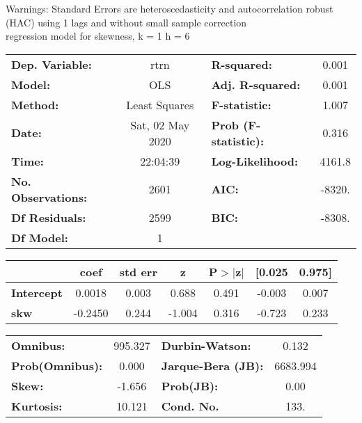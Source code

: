 Warnings: \newline
 [1] Standard Errors are heteroscedasticity and autocorrelation robust (HAC) using 1 lags and without small sample correction\\ 

regression model for skewness, k = 1 h = 6\begin{center}
\begin{tabular}{lclc}
\toprule
\textbf{Dep. Variable:}    &       rtrn       & \textbf{  R-squared:         } &     0.001   \\
\textbf{Model:}            &       OLS        & \textbf{  Adj. R-squared:    } &     0.001   \\
\textbf{Method:}           &  Least Squares   & \textbf{  F-statistic:       } &     1.007   \\
\textbf{Date:}             & Sat, 02 May 2020 & \textbf{  Prob (F-statistic):} &    0.316    \\
\textbf{Time:}             &     22:04:39     & \textbf{  Log-Likelihood:    } &    4161.8   \\
\textbf{No. Observations:} &        2601      & \textbf{  AIC:               } &    -8320.   \\
\textbf{Df Residuals:}     &        2599      & \textbf{  BIC:               } &    -8308.   \\
\textbf{Df Model:}         &           1      & \textbf{                     } &             \\
\bottomrule
\end{tabular}
\begin{tabular}{lcccccc}
                   & \textbf{coef} & \textbf{std err} & \textbf{z} & \textbf{P$> |$z$|$} & \textbf{[0.025} & \textbf{0.975]}  \\
\midrule
\textbf{Intercept} &       0.0018  &        0.003     &     0.688  &         0.491        &       -0.003    &        0.007     \\
\textbf{skw}       &      -0.2450  &        0.244     &    -1.004  &         0.316        &       -0.723    &        0.233     \\
\bottomrule
\end{tabular}
\begin{tabular}{lclc}
\textbf{Omnibus:}       & 995.327 & \textbf{  Durbin-Watson:     } &    0.132  \\
\textbf{Prob(Omnibus):} &   0.000 & \textbf{  Jarque-Bera (JB):  } & 6683.994  \\
\textbf{Skew:}          &  -1.656 & \textbf{  Prob(JB):          } &     0.00  \\
\textbf{Kurtosis:}      &  10.121 & \textbf{  Cond. No.          } &     133.  \\
\bottomrule
\end{tabular}
\end{center}

